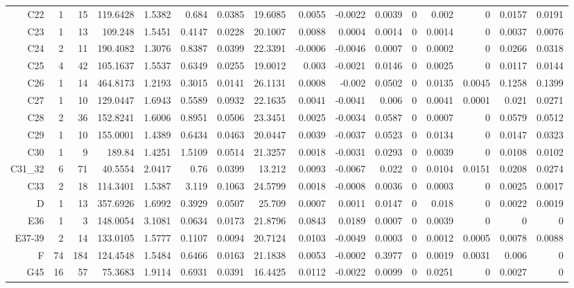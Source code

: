 \begin{table}[!htb]
{\begin{tabular}{rrrrrrrrrrrrrrrr}
C22 & 1 & 15 & 119.6428 & 1.5382 & 0.684 & 0.0385 & 19.6085 & 0.0055 & -0.0022 & 0.0039 & 0 & 0.002 & 0 & 0.0157 & 0.0191 \\
C23 & 1 & 13 & 109.248 & 1.5451 & 0.4147 & 0.0228 & 20.1007 & 0.0088 & 0.0004 & 0.0014 & 0 & 0.0014 & 0 & 0.0037 & 0.0076 \\
C24 & 2 & 11 & 190.4082 & 1.3076 & 0.8387 & 0.0399 & 22.3391 & -0.0006 & -0.0046 & 0.0007 & 0 & 0.0002 & 0 & 0.0266 & 0.0318 \\
C25 & 4 & 42 & 105.1637 & 1.5537 & 0.6349 & 0.0255 & 19.0012 & 0.003 & -0.0021 & 0.0146 & 0 & 0.0025 & 0 & 0.0117 & 0.0144 \\
C26 & 1 & 14 & 464.8173 & 1.2193 & 0.3015 & 0.0141 & 26.1131 & 0.0008 & -0.002 & 0.0502 & 0 & 0.0135 & 0.0045 & 0.1258 & 0.1399 \\
C27 & 1 & 10 & 129.0447 & 1.6943 & 0.5589 & 0.0932 & 22.1635 & 0.0041 & -0.0041 & 0.006 & 0 & 0.0041 & 0.0001 & 0.021 & 0.0271 \\
C28 & 2 & 36 & 152.8241 & 1.6006 & 0.8951 & 0.0506 & 23.3451 & 0.0025 & -0.0034 & 0.0587 & 0 & 0.0007 & 0 & 0.0579 & 0.0512 \\
C29 & 1 & 10 & 155.0001 & 1.4389 & 0.6434 & 0.0463 & 20.0447 & 0.0039 & -0.0037 & 0.0523 & 0 & 0.0134 & 0 & 0.0147 & 0.0323 \\
C30 & 1 & 9 & 189.84 & 1.4251 & 1.5109 & 0.0514 & 21.3257 & 0.0018 & -0.0031 & 0.0293 & 0 & 0.0039 & 0 & 0.0108 & 0.0102 \\
C31\_32 & 6 & 71 & 40.5554 & 2.0417 & 0.76 & 0.0399 & 13.212 & 0.0093 & -0.0067 & 0.022 & 0 & 0.0104 & 0.0151 & 0.0208 & 0.0274 \\
C33 & 2 & 18 & 114.3401 & 1.5387 & 3.119 & 0.1063 & 24.5799 & 0.0018 & -0.0008 & 0.0036 & 0 & 0.0003 & 0 & 0.0025 & 0.0017 \\
D & 1 & 13 & 357.6926 & 1.6992 & 0.3929 & 0.0507 & 25.709 & 0.0007 & 0.0011 & 0.0147 & 0 & 0.018 & 0 & 0.0022 & 0.0019 \\
E36 & 1 & 3 & 148.0054 & 3.1081 & 0.0634 & 0.0173 & 21.8796 & 0.0843 & 0.0189 & 0.0007 & 0 & 0.0039 & 0 & 0 & 0 \\
E37-39 & 2 & 14 & 133.0105 & 1.5777 & 0.1107 & 0.0094 & 20.7124 & 0.0103 & -0.0049 & 0.0003 & 0 & 0.0012 & 0.0005 & 0.0078 & 0.0088 \\
F & 74 & 184 & 124.4548 & 1.5484 & 0.6466 & 0.0163 & 21.1838 & 0.0053 & -0.0002 & 0.3977 & 0 & 0.0019 & 0.0031 & 0.006 & 0 \\
G45 & 16 & 57 & 75.3683 & 1.9114 & 0.6931 & 0.0391 & 16.4425 & 0.0112 & -0.0022 & 0.0099 & 0 & 0.0251 & 0 & 0.0027 & 0 \\

\end{tabular}}
\end{table}

